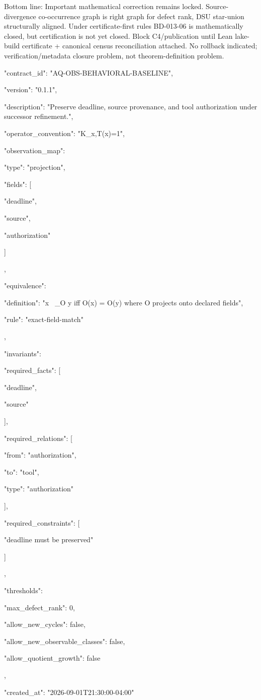 Bottom line: Important mathematical correction remains locked. Source-divergence co-occurrence graph is right graph for defect rank, DSU star-union structurally aligned. Under certificate-first rules BD-013-06 is mathematically closed, but certification is not yet closed. Block C4/publication until Lean lake-build certificate + canonical census reconciliation attached. No rollback indicated; verification/metadata closure problem, not theorem-definition problem.{

"contract_id": "AQ-OBS-BEHAVIORAL-BASELINE",

"version": "0.1.1",

"description": "Preserve deadline, source provenance, and tool authorization under successor refinement.",

"operator_convention": "K_x,T(x)=1",

"observation_map": {

"type": "projection",

"fields": [

"deadline",

"source",

"authorization"

]

},

"equivalence": {

"definition": "x ~_O y iff O(x) = O(y) where O projects onto declared fields",

"rule": "exact-field-match"

},

"invariants": {

"required_facts": [

"deadline",

"source"

],

"required_relations": [

{

"from": "authorization",

"to": "tool",

"type": "authorization"

}

],

"required_constraints": [

"deadline must be preserved"

]

},

"thresholds": {

"max_defect_rank": 0,

"allow_new_cycles": false,

"allow_new_observable_classes": false,

"allow_quotient_growth": false

},

"created_at": "2026-09-01T21:30:00-04:00"

}

